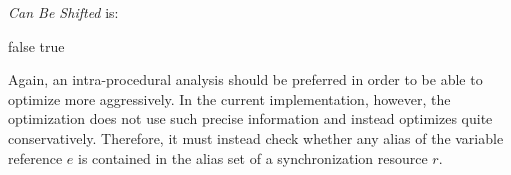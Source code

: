 \textit{Can Be Shifted} is:
\begin{algorithmic}
\State {}
    \State \Return false
  \EndIf
\EndFor
\State \Return true
\EndFunction
\end{algorithmic}
Again, an intra-procedural analysis should be preferred in order to be able to optimize more aggressively. In the current implementation, however, the optimization does not use such precise information and instead optimizes quite conservatively. Therefore, it must instead check whether any alias of the variable reference $e$ is contained in the alias set of a synchronization resource $r$.



